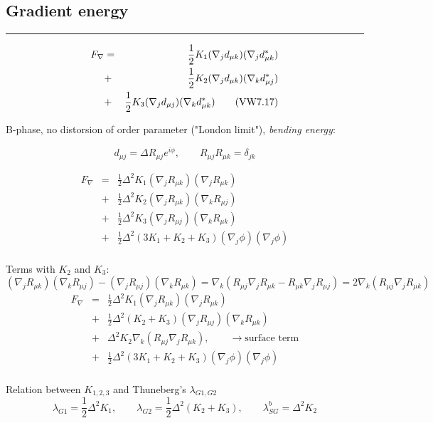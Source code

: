 \documentclass[a4paper]{article}
\begin{document}
\subsection*{Gradient energy}

\hrule

\begin{eqnarray*}
F_\nabla
&=& \frac12 K_1 (\nabla_j d_{\mu k})(\nabla_j d^*_{\mu k})\\
&+& \frac12 K_2 (\nabla_j d_{\mu k})(\nabla_k d^*_{\mu j})\\
&+& \frac12 K_3 (\nabla_j d_{\mu j})(\nabla_k d^*_{\mu k})
\qquad{\rm\small (VW 7.17)}\\
\end{eqnarray*}

B-phase, no distorsion of order parameter ("London limit"),
{\it bending energy}:

$$
d_{\mu j}=\Delta R_{\mu j} e^{i\phi},\qquad
R_{\mu j} R_{\mu k} = \delta_{jk}
$$

\begin{eqnarray*}
F_\nabla
&=& \frac12 \Delta^2 K_1
 (\nabla_j R_{\mu k})(\nabla_j R_{\mu k})\\
&+& \frac12 \Delta^2 K_2
 (\nabla_j R_{\mu k})(\nabla_k R_{\mu j})\\
&+& \frac12 \Delta^2 K_3
 (\nabla_j R_{\mu j})(\nabla_k R_{\mu k})\\
&+& \frac12 \Delta^2 (3K_1+K_2+K_3)
 (\nabla_j \phi)(\nabla_j \phi)\\
\end{eqnarray*}

Terms with $K_2$ and $K_3$:
$$
(\nabla_j R_{\mu k})(\nabla_k R_{\mu j}) - (\nabla_j R_{\mu j})(\nabla_k R_{\mu k}) =
\nabla_k(R_{\mu j} \nabla_j R_{\mu k} - R_{\mu k} \nabla_j R_{\mu j}) =
2\nabla_k(R_{\mu j} \nabla_j R_{\mu k})
$$
\begin{eqnarray*}
F_\nabla
&=& \frac12\Delta^2 K_1 (\nabla_j R_{\mu k})(\nabla_j R_{\mu k})\\
&+& \frac12\Delta^2 (K_2+K_3) (\nabla_j R_{\mu j})(\nabla_k R_{\mu k})\\
&+& \Delta^2 K_2 \nabla_k(R_{\mu j} \nabla_j R_{\mu k}),\qquad
\rightarrow \mbox{surface term}\\
&+& \frac12 \Delta^2 (3K_1+K_2+K_3)
 (\nabla_j \phi)(\nabla_j \phi)\\
\end{eqnarray*}

Relation between $K_{1,2,3}$ and Thuneberg's $\lambda_{G1,G2}$
$$
\lambda_{G1} = \frac12\Delta^2 K_1,\qquad
\lambda_{G2} = \frac12\Delta^2 (K_2+K_3),\qquad
\lambda_{SG}^b = \Delta^2 K_2
$$
\end{document}
